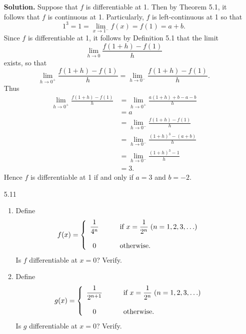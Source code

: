 \begin{enumerate}
      \textbf{Solution.} Suppose that $f$ is differentiable at 1. Then by
      Theorem 5.1, it follows that $f$ is continuous at 1. Particularly, $f$ is
      left-continuous at 1 so that
      $$1^3 = 1 = \lim_{x \to 1^-}f(x) = f(1) = a + b.$$
      Since $f$ is differentiable at 1, it follows by Definition 5.1 that the 
      limit
      $$\lim_{h \to 0}\frac{f(1 + h) - f(1)}{h}$$
      exists, so that
      $$\lim_{h \to 0^+}\frac{f(1 + h) - f(1)}{h} =
        \lim_{h \to 0^-}\frac{f(1 + h) - f(1)}{h}.$$
      Thus
      \begin{align*}
         \lim_{h \to 0^+}\frac{f(1 + h) - f(1)}{h} &=
            \lim_{h \to 0^+}\frac{a(1 + h) + b - a - b}{h} \\
            &= a \\
            &= \lim_{h \to 0^-}\frac{f(1 + h) - f(1)}{h} \\
            &= \lim_{h \to 0^-}\frac{(1 + h)^3 - (a + b)}{h} \\
            &= \lim_{h \to 0^-}\frac{(1 + h)^3 - 1}{h} \\
            &= 3.
      \end{align*}
      Hence $f$ is differentiable at 1 if and only if $a = 3$ and $b = -2$.
   \item[5.11] \begin{enumerate}
                  \item Define
                        \begin{equation*}
                           f(x) = \left\{\begin{array}{cl}
                              \displaystyle\frac{1}{4^n} & \qquad\text{if }
                              x = \displaystyle\frac{1}{2^n} \; (n = 1, 2, 3, \ldots) \\\\
                              0 & \qquad\text{otherwise}.
                           \end{array} \right.
                        \end{equation*}
                        Is $f$ differentiable at $x = 0$? Verify.
                  \item Define
                        \begin{equation*}
                           g(x) = \left\{\begin{array}{cl}
                              \displaystyle\frac{1}{2^{n+1}} & \qquad\text{if }
                              x = \displaystyle\frac{1}{2^n} \; (n = 1, 2, 3, \ldots) \\\\
                              0 & \qquad\text{otherwise}.
                           \end{array} \right.
                        \end{equation*}
                        Is $g$ differentiable at $x = 0$? Verify.            
               \end{enumerate}


\end{enumerate}
